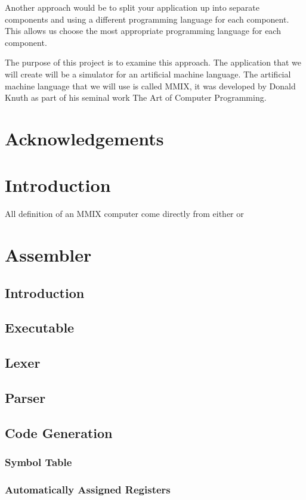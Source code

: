 \documentclass[a4paper,11pt]{report}
\begin{document}
Another approach would be to split your application up into separate components and using a different programming language for each component. This allows us choose the most appropriate programming language for each component.

The purpose of this project is to examine this approach. The application that we will create will be a simulator for an artificial machine language. The artificial machine language that we will use is called MMIX, it was developed by Donald Knuth as part of his seminal work The Art of Computer Programming\cite{knuth:aocp1}.
\newpage
{}
\tableofcontents
\newpage
\listoffigures
\newpage
\chapter*{Acknowledgements}
\chapter{Introduction}
All definition of an MMIX computer come directly from either \cite{knuth:aocp1} or \cite{knuth:aocp2}
\chapter{Assembler}
\section{Introduction}
\section{Executable}
\section{Lexer}
\section{Parser}
\section{Code Generation}
\subsection{Symbol Table}
\subsection{Automatically Assigned Registers}
\end{document}
